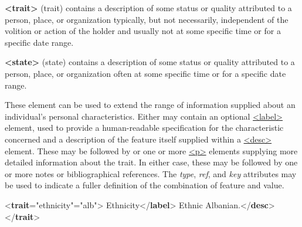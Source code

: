 \begin{sansreflist}
  
\item [\textbf{<trait>}] (trait) contains a description of some status or quality attributed to a person, place, or organization typically, but not necessarily, independent of the volition or action of the holder and usually not at some specific time or for a specific date range.
\item [\textbf{<state>}] (state) contains a description of some status or quality attributed to a person, place, or organization often at some specific time or for a specific date range.
\end{sansreflist}
 These element can be used to extend the range of information supplied about an individual's personal characteristics. Either may contain an optional \hyperref[TEI.label]{<label>} element, used to provide a human-readable specification for the characteristic concerned and a description of the feature itself supplied within a \hyperref[TEI.desc]{<desc>} element. These may be followed by or one or more \hyperref[TEI.p]{<p>} elements supplying more detailed information about the trait. In either case, these may be followed by one or more notes or bibliographical references. The {\itshape type}, {\itshape ref}, and {\itshape key} attributes may be used to indicate a fuller definition of the combination of feature and value. \par\bgroup{}\exampleFont \begin{shaded}\noindent\mbox{}{<\textbf{trait}\hspace*{1em}{type}="{ethnicity}"\hspace*{1em}{key}="{alb}">}\mbox{}\newline 
{}Ethnicity{</\textbf{label}>}\mbox{}\newline 
{}Ethnic Albanian.{</\textbf{desc}>}\mbox{}\newline 
{</\textbf{trait}>}\end{shaded}\egroup\par \par
